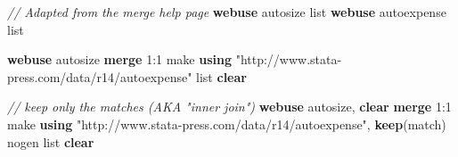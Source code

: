 \documentclass[
]{book}
\newenvironment{Shaded}{\begin{snugshade}}{\end{snugshade}}
\newcommand{\CommentTok}[1]{\textcolor[rgb]{0.56,0.35,0.01}{\textit{#1}}}
\newcommand{\FunctionTok}[1]{\textcolor[rgb]{0.00,0.00,0.00}{#1}}
\newcommand{\KeywordTok}[1]{\textcolor[rgb]{0.13,0.29,0.53}{\textbf{#1}}}
\newcommand{\NormalTok}[1]{#1}
\newcommand{\OtherTok}[1]{\textcolor[rgb]{0.56,0.35,0.01}{#1}}
\newcommand{\StringTok}[1]{\textcolor[rgb]{0.31,0.60,0.02}{#1}}
\begin{document}
\begin{Shaded}
\begin{Highlighting}[]
  \CommentTok{// Adapted from the merge help page}
  \KeywordTok{webuse}\NormalTok{ autosize }
  \OtherTok{list}
  \KeywordTok{webuse}\NormalTok{ autoexpense}
  \OtherTok{list}

  \KeywordTok{webuse}\NormalTok{ autosize}
  \KeywordTok{merge}\NormalTok{ 1:1 make }\KeywordTok{using} \StringTok{"http://www.stata-press.com/data/r14/autoexpense"}
  \OtherTok{list}
  \KeywordTok{clear}

  \CommentTok{// keep only the matches (AKA "inner join")}
  \KeywordTok{webuse}\NormalTok{ autosize, }\KeywordTok{clear}
  \KeywordTok{merge}\NormalTok{ 1:1 make }\KeywordTok{using} \StringTok{"http://www.stata-press.com/data/r14/autoexpense"}\NormalTok{, }\KeywordTok{keep}\NormalTok{(}\FunctionTok{match}\NormalTok{) nogen}
  \OtherTok{list}
  \KeywordTok{clear}
\end{Highlighting}
\end{Shaded}
\end{document}
